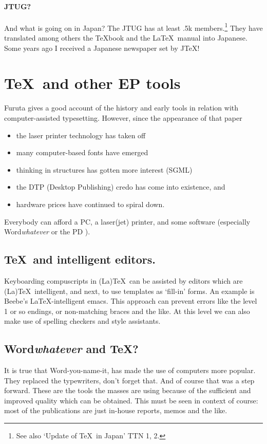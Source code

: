 \paragraph*{JTUG?}And what is going on in Japan?
The JTUG has at least .5k members.\footnote{See also `Update of \TeX\ in Japan'
   TTN 1, 2.} They have translated among others the \TeX book and the
   \LaTeX\ manual into Japanese.
Some years ago I received a Japanese newspaper set by J\TeX!

\section{\TeX\ and other EP tools}
Furuta gives a good account of the history and early tools
in relation with computer-assisted typesetting. However, since the appearance
of that paper
\begin{itemize}
\item the laser printer technology has taken off
\item many computer-based fonts have emerged
\item thinking in structures has gotten more interest (SGML)
\item the DTP (Desktop Publishing) credo has come into existence, and
\item hardware prices have continued to spiral down.
\end{itemize}
Everybody can afford a PC, a laser(jet) printer, and some software (especially
Word{\em whatever\/} or the PD \AllTeX). %

\subsection{\TeX\ and intelligent editors.}
Keyboarding compuscripts in (La)\TeX\ can be assisted by editors which
are (La)\TeX\ intelligent, and next, to use templates as `fill-in' forms.
An example is Beebe's \LaTeX-intelligent emacs.
This approach can prevent errors like the level 1 or so endings, or
non-matching braces and the like.
At this level we can also make use of spelling checkers and style
assistants.

\subsection{Word{\it whatever\/} and \TeX?}
It is true that Word-you-name-it, has made the use of computers more popular.
They replaced the typewriters, don't forget that. And of course that was a
step forward. These are the tools the masses are using because of the
sufficient and improved quality which can be obtained.
This must be seen in context of course: most of the publications
are just in-house reports, memos and the like.

